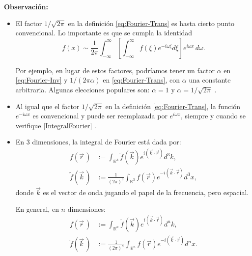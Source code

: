 \begin{shaded}
\vspace{0.1cm}
\textbf{Observación:}
\begin{itemize}
\item El factor $1/\sqrt{2\pi}$ en la definición \eqref{eq:Fourier-Trans} es hasta cierto punto convencional. Lo importante es que se cumpla la identidad
    \begin{equation}
        f(x) \sim \frac{1}{2\pi} \int_{-\infty}^{\infty} \left[\int_{-\infty}^{\infty} f(\xi) e^{-i\omega\xi} d\xi \right] e^{i\omega x} \,d\omega.
      \label{IntegralFourier}
    \end{equation}
   
    Por ejemplo, en lugar de estos factores, podríamos tener un factor $\alpha$ en \eqref{eq:Fourier-Inv} y $1/(2\pi \alpha)$ en \eqref{eq:Fourier-Trans}, con $\alpha$ una constante arbitraria. Algunas elecciones populares son: $\alpha = 1$ y $\alpha = 1/\sqrt{2\pi}$ \cite{Rubilar}.

    \item Al igual que el factor $1/\sqrt{2\pi}$ en la definición \eqref{eq:Fourier-Trans}, la función $e^{-i\omega x}$ es convencional y puede ser reemplazada por $e^{i\omega x}$, siempre y cuando se verifique \eqref{IntegralFourier} \cite{Butkov, Riley}.
    
    \item En 3 dimensiones, la integral de Fourier está dada por:
    \begin{align*}
         f(\vec{r}\,) &:= \int_{\mathbb{R}^3} \tilde{f}(\vec{k}) e^{i (\vec{k} \cdot \vec{r})} d^3k, \\
         \tilde{f}(\vec{k}\,) &:= \frac{1}{(2\pi)^3} \int_{\mathbb{R}^3} f(\vec{r}) e^{-i (\vec{k} \cdot \vec{r})} d^3x,
    \end{align*}
    donde $\vec{k}$ es el vector de onda jugando el papel de la frecuencia, pero espacial.
    
    En general, en $n$ dimensiones:
     \begin{align*}
         f(\vec{r}\,) &:= \int_{\mathbb{R}^n} \tilde{f}(\vec{k}) e^{i (\vec{k} \cdot \vec{r})} d^n k, \\
         \tilde{f}(\vec{k}\,) &:= \frac{1}{(2\pi)^n} \int_{\mathbb{R}^n} f(\vec{r}) e^{-i (\vec{k} \cdot \vec{r})} d^n x.
    \end{align*}

\end{itemize}
\end{shaded}

